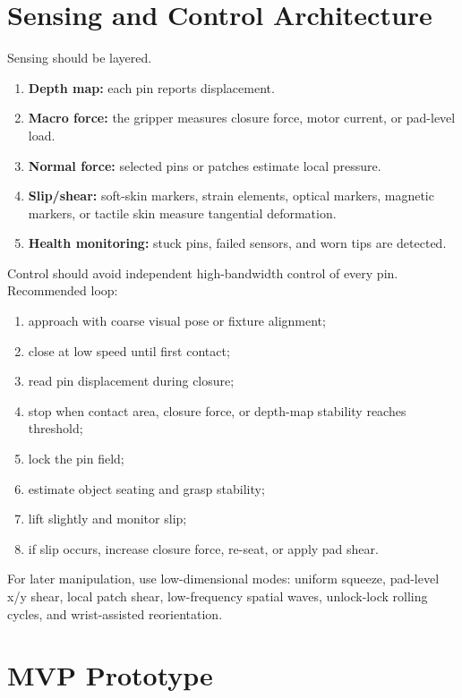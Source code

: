 \documentclass[11pt]{article}
\begin{document}
\section{Sensing and Control Architecture}

Sensing should be layered.

\begin{enumerate}
  \item \textbf{Depth map:} each pin reports displacement.
  \item \textbf{Macro force:} the gripper measures closure force, motor current, or pad-level load.
  \item \textbf{Normal force:} selected pins or patches estimate local pressure.
  \item \textbf{Slip/shear:} soft-skin markers, strain elements, optical markers, magnetic markers, or tactile skin measure tangential deformation.
  \item \textbf{Health monitoring:} stuck pins, failed sensors, and worn tips are detected.
\end{enumerate}

Control should avoid independent high-bandwidth control of every pin. Recommended loop:

\begin{enumerate}
  \item approach with coarse visual pose or fixture alignment;
  \item close at low speed until first contact;
  \item read pin displacement during closure;
  \item stop when contact area, closure force, or depth-map stability reaches threshold;
  \item lock the pin field;
  \item estimate object seating and grasp stability;
  \item lift slightly and monitor slip;
  \item if slip occurs, increase closure force, re-seat, or apply pad shear.
\end{enumerate}

For later manipulation, use low-dimensional modes: uniform squeeze, pad-level x/y shear, local patch shear, low-frequency spatial waves, unlock-lock rolling cycles, and wrist-assisted reorientation.

\section{MVP Prototype}
\end{document}
